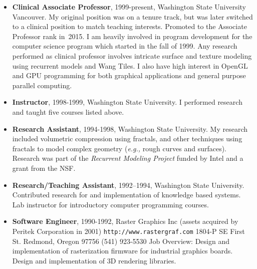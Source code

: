 \documentclass[10pt]{article}
\begin{document}
\begin{itemize}
\item {\bf Clinical Associate Professor}, 1999-present,
Washington State University Vancouver.
My original position was on a tenure track, but was later switched
to a clinical position to match teaching interests. Promoted
to the Associate Professor rank in~2015.
I am heavily involved in program development for 
the computer science program which started in the fall of 1999.
Any research performed as clinical professor involves intricate surface and texture
modeling using recurrent models and Wang Tiles.
I also have high interest in OpenGL and GPU programming for both
graphical applications and general purpose parallel computing.

\item {\bf Instructor}, 1998-1999,
Washington State University. I performed research and taught five
courses listed above.

\item {\bf Research Assistant}, 1994-1998,
Washington State University.
My research included volumetric compression using fractals,
and other techniques using fractals to model complex geometry
({\it e.g.,} rough curves and surfaces). Research was part of the
{\em Recurrent Modeling Project} funded by Intel and a grant
from the NSF.

\item {\bf Research/Teaching Assistant}, 1992--1994, 
Washington State University.
Contributed research for and implementation of knowledge based systems.
Lab instructor for
introductory computer programming courses.

\item {\bf Software Engineer}, 1990-1992,
Raster Graphics Inc
(assets acquired by Peritek Corporation in 2001)
{\tt http://www.rastergraf.com}
1804-P SE First St.
Redmond, Oregon 97756
(541) 923-5530
Job Overview: 
Design and implementation of rasterization firmware for
industrial graphics boards. Design and implementation of
3D rendering libraries.
\end{itemize}
\end{document}
